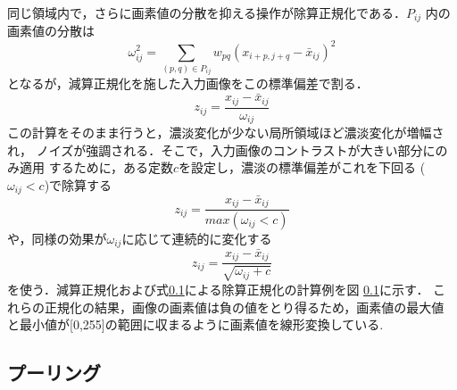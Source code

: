 \documentclass[a4paper,10pt]{jsarticle}
\begin{document}
同じ領域内で，さらに画素値の分散を抑える操作が除算正規化である．$P_{ij}$
内の画素値の分散は
\begin{equation}
 \omega^2_{ij}=\sum_{(p,q)\in{P_{ij}}}^{} w_{pq}(x_{i+p,j+q}-\bar{x}_{ij})^2
\end{equation}
となるが，減算正規化を施した入力画像をこの標準偏差で割る．
\begin{equation}
 z_{ij}=\frac{x_{ij}-\bar{x}_{ij}}{\omega_{ij}}
\end{equation}
この計算をそのまま行うと，濃淡変化が少ない局所領域ほど濃淡変化が増幅され，
ノイズが強調される．そこで，入力画像のコントラストが大きい部分にのみ適用
するために，ある定数$c$を設定し，濃淡の標準偏差がこれを下回る
($\omega_{ij}<c$)で除算する
\begin{equation}
 z_{ij}=\frac{x_{ij}-\bar{x}_{ij}}{max(\omega_{ij}<c)}
\end{equation}
や，同様の効果が$\omega_{ij}$に応じて連続的に変化する
\begin{equation}
 z_{ij}=\frac{x_{ij}-\bar{x}_{ij}}{\sqrt{\omega_{ij}+c}}
\end{equation}
を使う．減算正規化および式\ref{}による除算正規化の計算例を図
\ref{}に示す．
これらの正規化の結果，画像の画素値は負の値をとり得るため，画素値の最大値
と最小値が[0,255]の範囲に収まるように画素値を線形変換している.

\subsection{プーリング}

\end{document}
